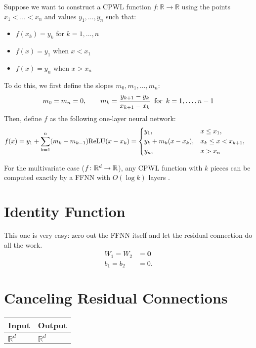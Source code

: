 Suppose we want to construct a CPWL function \(f \colon \mathbb{R} \to \mathbb{R}\) using the points \(x_1 < \ldots < x_n\) and values \(y_1, \ldots, y_n\) such that:
\begin{itemize}
    \item \(f(x_k) = y_k\) for \(k = 1, \ldots, n\)
    \item \(f(x) = y_1\) when \(x < x_1\)
    \item \(f(x) = y_n\) when \(x > x_n\)
\end{itemize}
To do this, we first define the slopes \(m_0, m_1, \ldots, m_n\):
\begin{align*}
    m_0 = m_{n} = 0,
    \qquad
    m_k = \frac{y_{k+1} - y_{k}}{x_{k+1} - x_{k}}
    \enskip \text{for} \enskip k = 1, \ldots, n-1
\end{align*}
Then, define \(f\) as the following one-layer neural network:
\begin{align*}
    f(x) &= y_1 + \sum_{k = 1}^{n} (m_{k} - m_{k-1}) \mathrm{ReLU}(x - x_k)
    = \begin{dcases}
        y_1, &x \leq x_1, \\
        y_k + m_{k} (x - x_k), & x_k \leq x < x_{k+1}, \\
        y_n, & x > x_n
    \end{dcases}
\end{align*}

For the multivariate case ($f \colon \mathbb{R}^d \to \mathbb{R}$), any CPWL function with $k$ pieces can be computed exactly by a FFNN with $O(\log k)$ layers \citep{arora+:2018}.

\section{Identity Function}\label{sec:ffnn_identity}

This one is very easy: zero out the FFNN itself and let the residual connection do all the work.
\begin{align*}
W_1 = W_2 &= \mathbf{0} \\
b_1 = b_2 &= 0.
\end{align*}

\section{Canceling Residual Connections}\label{sec:ffnn_cancel_residual}

    \begin{tabular}{|p{1.5cm}|p{1.5cm}|}
        \hline
        \rowcolor{orange!20} %
        \textbf{Input} & \textbf{Output} \\
        \hline
        $\mathbb{R}^d$ & $\mathbb{R}^d$ \\
        \hline
    \end{tabular}

